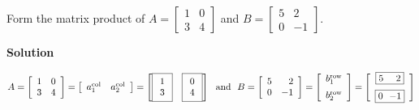 \begin{example}
\label{ex:LUprod}
Form the matrix product of $A=\left[\begin{array}{cc} 1 & 0\\
3 & 4\end{array}\right]$ and $B=\left[\begin{array}{rr}
 5 &2  \\
0 & -1 \end{array}\right].$
\end{example}

\textbf{Solution}

$$A=\left[\begin{array}{cc} 1 & 0\\
3 & 4\end{array}\right] = \left[\begin{array}{cc} a_1^{\rm col} & a_2^{\rm col} \end{array}\right]  = 
\left[ \boxed{\begin{array}{c} 1 \\ 3 \end{array} }~~~
\boxed{\begin{array}{c} 0 \\ 4 \end{array} }\right]
~~\text{and}~~B=\left[\begin{array}{rr}
 5 &2  \\
0 & -1 \end{array}\right] = \left[\begin{array}{c} b_1^{\rm row} \medskip \\
b_2^{\rm row} \end{array}\right]  = \left[\begin{array}{c}\boxed{ 5 ~~~~ 2} \medskip \\
\boxed{ 0 ~~{-1}}
\end{array} \right]$$

